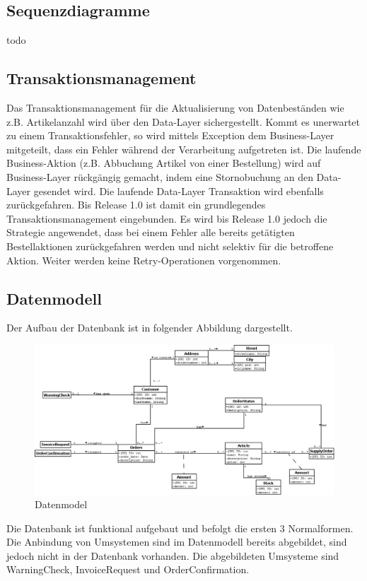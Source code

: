 \clearpage
\subsection{Sequenzdiagramme}
todo

\subsection{Transaktionsmanagement}
Das Transaktionsmanagement für die Aktualisierung von Datenbeständen wie z.B. Artikelanzahl wird über den Data-Layer sichergestellt. Kommt es unerwartet zu einem Transaktionsfehler, so wird mittels Exception dem Business-Layer mitgeteilt, dass ein Fehler während der Verarbeitung aufgetreten ist. Die laufende Business-Aktion (z.B. Abbuchung Artikel von einer Bestellung) wird auf Business-Layer rückgängig gemacht, indem eine Stornobuchung an den Data-Layer gesendet wird. Die laufende Data-Layer Transaktion wird ebenfalls zurückgefahren.
Bis Release 1.0 ist damit ein grundlegendes Transaktionsmanagement eingebunden. Es wird bis Release 1.0 jedoch die Strategie angewendet, dass bei einem Fehler alle bereits getätigten Bestellaktionen zurückgefahren werden und nicht selektiv für die betroffene Aktion. Weiter werden keine Retry-Operationen vorgenommen.

\subsection{Datenmodell}
Der Aufbau der Datenbank ist in folgender Abbildung dargestellt.
\begin{figure}[H]
	\includegraphics[width=1.0\linewidth]{Images/datamodel}
	\caption{Datenmodel}
	\label{fig:datamodel}
\end{figure}
Die Datenbank ist funktional aufgebaut und befolgt die ersten 3 Normalformen. Die Anbindung von Umsystemen sind im Datenmodell bereits abgebildet, sind jedoch nicht in der Datenbank vorhanden. Die abgebildeten Umsysteme sind WarningCheck, InvoiceRequest und OrderConfirmation.

